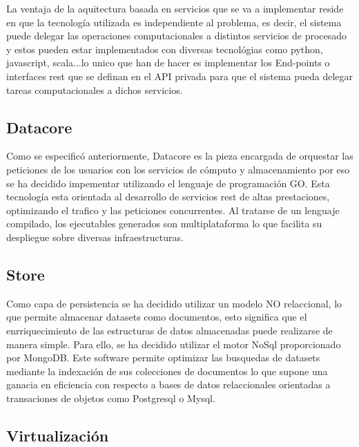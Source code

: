\documentclass[a4paper,11pt]{book}
\begin{document}
La ventaja de la aquitectura basada en servicios que se va a implementar reside en que la tecnología utilizada es independiente al problema, es decir, el sistema puede delegar las operaciones computacionales a distintos servicios de procesado y estos pueden estar implementados con diversas tecnológias como python, javascript, scala...lo unico que han de hacer es implementar los End-points o interfaces rest que se definan en el API privada para que el sistema pueda delegar tareas computacionales a dichos servicios.

\subsection{Datacore}

Como se especificó anteriormente, Datacore es la pieza encargada de orquestar las peticiones de los usuarios con los servicios de cómputo y almacenamiento por eso se ha decidido impementar utilizando el lenguaje de programación GO\cite{go}. Esta tecnología esta orientada al desarrollo de servicios rest de altas prestaciones, optimizando el trafico y las peticiones concurrentes. Al tratarse de un lenguaje compilado, los ejecutables generados son multiplataforma lo que facilita su despliegue sobre diversas infraestructuras. 

\subsection{Store}

Como capa de persistencia se ha decidido utilizar un modelo NO relaccional, lo que permite almacenar datasets como documentos, esto significa que el enrriquecimiento de las estructuras de datos almacenadas puede realizarse de manera simple. Para ello, se ha decidido utilizar el motor NoSql proporcionado por MongoDB\cite{mongo}. Este software permite optimizar las busquedas de datasets mediante la indexación de sus colecciones de documentos lo que supone una ganacia en eficiencia con respecto a bases de datos relaccionales orientadas a transaciones de objetos como Postgresql o Mysql.   

\subsection{Virtualización}
\end{document}
